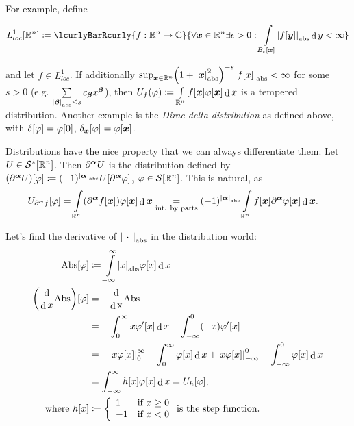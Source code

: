 \documentclass[10pt]{article}
\DeclarePairedDelimiter\singleBars{\lvert}{\rvert}
\DeclarePairedDelimiter\parentheses{\lparen}{\rparen}
\DeclarePairedDelimiter\squareBrackets{[}{]}
\DeclareMathOperator{\diffd}{d}
\newcommand{\R}{\mathbb{R}}
\newcommand{\C}{\mathbb{C}}
\newcommand{\SchwartzSpace}{\mathcal{S}}
\newcommand\of[1]{\parentheses*{#1}}
\newcommand\abs[1]{\singleBars*{#1}}
\newcommand{\setst}[2]{\lcurlyBarRcurly{#1}{#2}}
\newcommand\gj\varphi
\renewcommand\ge\epsilon
\newcommand{\vx}{{\vectorsym x}}
\newcommand{\vy}{{\vectorsym y}}
\newcommand{\miga}{{\vectorsym \alpha}}
\newcommand{\migb}{{\vectorsym \beta}}
\newcommand\placeholder{\,\:\cdot\:\,}
\renewcommand\of[1]{\squareBrackets*{#1}}
\renewcommand\abs[1]{\singleBars*{#1}_{\mathrm{abs}}}
\newcommand\Int[1]{\int\limits_{#1}}
\newcommand{\Sum}[1]{\sum\limits_{#1}}
\newcommand{\Rn}{{\R^n}}
\newcommand{\Schwartz}{{\SchwartzSpace\of{\Rn}}}
\begin{document}
  For example, define

  \begin{equation*}
    L^1_{loc}\of\Rn \coloneqq \setst{f: \Rn \rightarrow \C}{\forall \vx \in \Rn \exists \ge > 0: \Int{B_\ge\of\vx}\abs{f\of\vy} \diffd{y} < \infty}
  \end{equation*}

  and let $f \in L^1_{loc}$. If additionally $\sup_{\vx \in \Rn}\parentheses*{1 + \abs{\vx}^2}^{-s}\abs{f\of{x}} < \infty$ for some $s > 0$ (e.g. $\Sum{\abs{\migb}\leq s} c_\migb x^\migb$), then $U_f(\gj) \coloneqq \Int\Rn f\of{\vx} \gj\of{\vx} \diffd{x}$ is a tempered distribution. Another example is the \emph{Dirac delta distribution} as defined above, with $\delta\of\gj = \gj\of{0}$, $\delta_\vx\of{\gj} = \gj\of{\vx}$.

  Distributions have the nice property that we can always differentiate them: Let $U \in \SchwartzSpace^*\of\Rn$. Then $\partial^\miga U$ is the distribution defined by $\parentheses*{\partial^\miga U}\of{\gj} \coloneqq (-1)^{\abs{\miga}} U\of{\partial^\miga \gj}$, $\gj \in \Schwartz$. This is natural, as
  \begin{align*}
    U_{\partial^\miga f}\of\gj &= \Int\Rn\parentheses*{\partial^\miga f\of\vx} \gj\of\vx \diffd{\vx} \underset{\text{int. by parts}}{=} (-1)^{\abs{\miga}} \Int\Rn f\of\vx \partial^\miga \gj\of\vx \diffd{\vx}.
  \end{align*}

  Let's find the derivative of $\abs{\placeholder}$ in the distribution world:
  \begin{align*}
    \mathrm{Abs}\of\gj &\coloneqq \Int{-\infty}^{\infty} \abs{x} \gj\of{x} \diffd{x}\\
    \parentheses*{\frac{\diffd}{\diffd{x}}\mathrm{Abs}}\of\gj &= -\mathrm{\frac{\diffd}{\diffd{x}}\mathrm{Abs}} \\
    &= - \int_0^\infty x \gj'\of{x} \diffd{x} - \int_{-\infty}^0(-x) \gj'\of{x} \\
    &= - \left. x \gj\of{x}\right|_0^\infty + \int_0^\infty \gj\of{x} \diffd{x} + \left. x \gj\of{x} \right|_{-\infty}^0 - \int_{-\infty}^0 \gj\of{x} \diffd{x} \\
    &= \int_{-\infty}^{\infty} h\of{x} \gj\of{x} \diffd{x} = U_h\of\gj,\\
    \text{where } h\of{x} &\coloneqq \left\{
	\begin{array}{ll}
		1  & \mbox{if } x \geq 0 \\
		-1 & \mbox{if } x < 0
	\end{array}
\right.
    \text{is the step function}.
  \end{align*}
\end{document}
